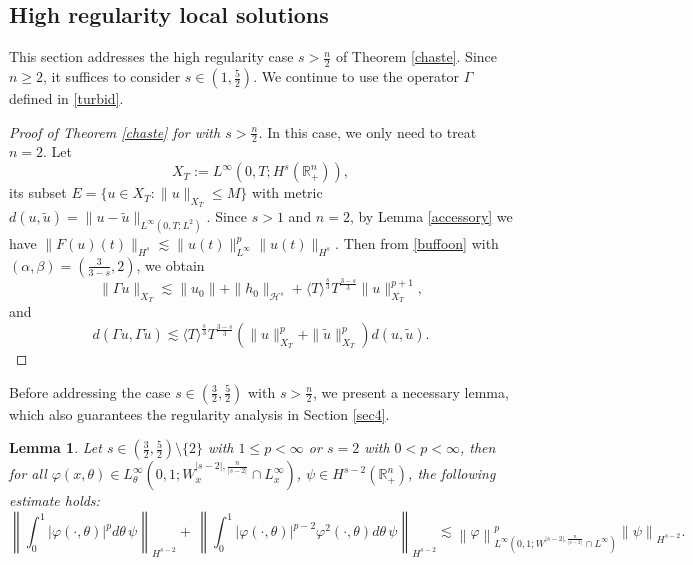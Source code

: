 \documentclass[preprint,compress,12pt]{elsarticle}
\newtheorem{lemma}[theorem]{Lemma}
\numberwithin{equation}{section}
\begin{document}
\subsection{High regularity local solutions}
This section addresses the high regularity case $s > \frac{n}{2}$ of Theorem \ref{chaste}. Since $n\geq2$, it suffices to consider $s \in \left(1, \frac{5}{2}\right)$. We continue to use the operator $\Gamma$ defined in \eqref{turbid}.
\begin{proof}[Proof of Theorem \ref{chaste} for \text{$s\in \left(1,\frac{3}{2}\right]$} with $s> \frac{n}{2}$] In this case, we only need to treat $n=2$. Let $$X_{T}:=L^{\infty}(0,T;H^{s}(\mathbb{R}_{+}^n)),$$ its subset $E=\{ u\in X_{T}: \|u\|_{X_{T}}\leq M \}$ with metric $d(u,\tilde{u})=\|u-\tilde{u}\|_{L^{\infty}(0,T;L^{2})}$. Since $s>1$ and $n=2$, by Lemma \ref{accessory} we have $\|F(u)(t)\|_{H^{s}}\lesssim \|u(t)\|_{L^{\infty}}^{p}\|u(t)\|_{H^{s}}$. Then from \eqref{buffoon} with $(\alpha,\beta)=(\frac{3}{3-s},2)$, we obtain
	\[
	\|\Gamma u\|_{X_{T}}\lesssim  \|u_{0}\|+\|h_{0}\|_{\mathcal{H}^{s}}+\langle T\rangle^{\frac{s}{3}}  T^{\frac{3-s}{3}}\|u\|_{X_{T}}^{p+1},
	\]
	and
	\[
	d\left(\Gamma u, \Gamma \tilde{u}\right)\lesssim \langle T\rangle^{\frac{s}{3}}  T^{\frac{3-s}{3}}\left(\|u\|_{X_{T}}^{p}+\|\tilde{u}\|_{X_{T}}^{p}\right)d(u,\tilde{u}).
	\]
\end{proof}
Before addressing the case $s\in \left(\frac{3}{2},\frac{5}{2}\right)$ with $s>\frac{n}{2}$, we present a necessary lemma, which also guarantees the regularity analysis in Section \ref{sec4}.
\begin{lemma}\label{imp}
	Let $s\in \left(\frac{3}{2},\frac{5}{2}\right)\setminus\{2\}$ with $1\leq p<\infty$ or $s=2$ with $0< p<\infty$,  then for all $\varphi(x,\theta)\in L^{\infty}_{\theta}(0,1; W_{x}^{|s-2|,\frac{n}{|s-2|}}\cap L_{x}^{\infty})$, $\psi\in H^{s-2}(\mathbb{R}_{+}^{n})$,
	the following estimate holds:
	{\small\begin{equation}\label{obstruct}
			\left\|\int_{0}^{1}\left|\varphi(\cdot,\theta)\right|^{p}d\theta\,\psi\right\|_{H^{s-2}}+\,\left\|\int_{0}^{1}\left|\varphi(\cdot,\theta)\right|^{p-2}\varphi^{2}(\cdot,\theta)d\theta\,\psi\right\|_{H^{s-2}}\lesssim \left\|\varphi\right\|_{L^{\infty}(0,1; W^{|s-2|,\frac{n}{|s-2|}}\cap L^{\infty})}^{p}
			\left\|\psi\right\|_{H^{s-2}}.
	\end{equation}}
\end{lemma}
\end{document}
